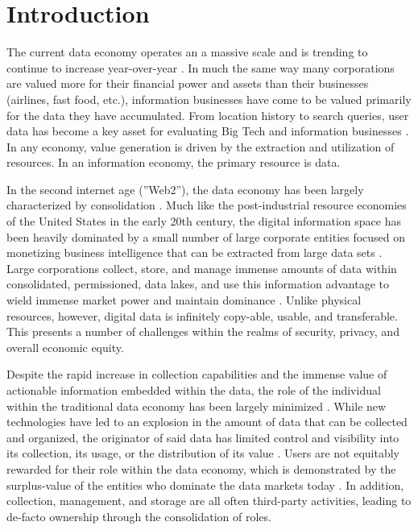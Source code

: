 \section{Introduction}

The current data economy operates an a massive scale and is trending to continue to increase year-over-year \cite{DataAssetValuation}\cite{DataEconomyCitzenConsumer}\cite{DataEconomyValueOfData}. 
In much the same way many corporations are valued more for their financial power and assets than their businesses (airlines, fast food, etc.), 
information businesses have come to be valued primarily for the data they have accumulated. From location history to 
search queries, user data has become a key asset for evaluating Big Tech and information businesses \cite{vectorsOfDigitalTransformation}\cite{industrialPolicyDataDriven}. 
In any economy, value generation is driven by the extraction and utilization of resources. In an information economy, the primary resource is data. 

In the second internet age (”Web2”), the data economy has been largely characterized by consolidation \cite{ConsolitdationWeb}\cite{ConsolitdationInternetEconomy}. 
Much like the post-industrial resource economies of the United States in the early 20th century, the digital information space has been heavily dominated by a small 
number of large corporate entities focused on monetizing business intelligence that can be extracted from large data sets \cite{DataAssetValuation}. Large corporations 
collect, store, and manage immense amounts of data within consolidated, permissioned, data lakes, and use this information advantage to wield immense market power and 
maintain dominance \cite{DataOwnershipBigTechAccessControl}. Unlike physical resources, however, digital data is infinitely copy-able, usable, and transferable. This 
presents a number of challenges within the realms of security, privacy, and overall economic equity.

Despite the rapid increase in collection capabilities and the immense value of actionable information embedded within the data, the role of the individual within the 
traditional data economy has been largely minimized \cite{DataOwnershipBigTechAccessControl}\cite{DataEconomyCitzenConsumer}. While new technologies have led to an explosion 
in the amount of data that can be collected and organized, the originator of said data has limited control and visibility into its collection, its usage, or the distribution of its 
value \cite{auxier_americans_2019}. Users are not equitably rewarded for their role within the data economy, which is demonstrated by the surplus-value of the 
entities who dominate the data markets today \cite{DataOwnershipBigTechAccessControl}\cite{DataEconomyValueOfData}\cite{DataAssetValuation}. In addition, collection, management, 
and storage are all often third-party activities, leading to de-facto ownership through the consolidation of roles.

